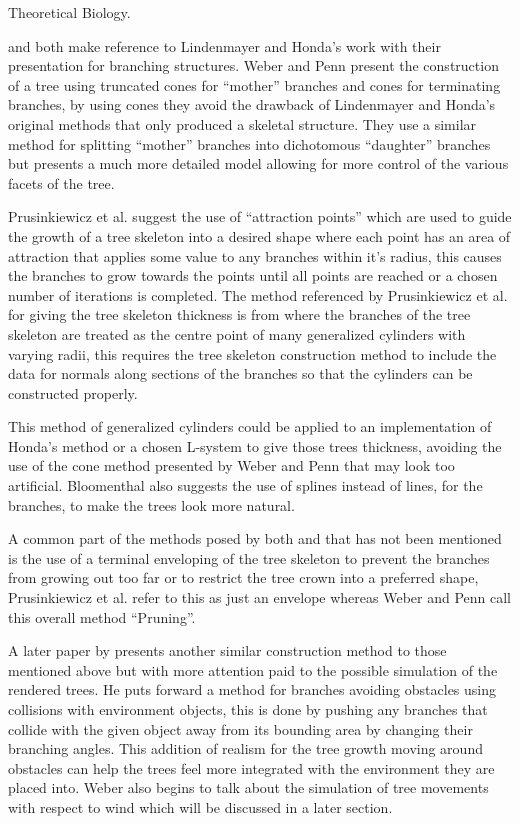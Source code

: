 \documentclass[review]{cmpreport}
\begin{document}
Theoretical Biology. \par
\cite{weber1995rendering} and \cite{runions2007colonization} both make reference to 
Lindenmayer and Honda's work with their presentation for branching structures. 
Weber and Penn present the construction of a tree using truncated cones for ``mother'' 
branches and cones for terminating branches, by using cones they avoid the drawback 
of Lindenmayer and Honda's original methods that only produced a skeletal structure. 
They use a similar method for splitting ``mother'' branches into dichotomous 
``daughter'' branches but presents a much more detailed model allowing for more 
control of the various facets of the tree. \par
Prusinkiewicz et al. suggest the use of ``attraction points'' which are used to 
guide the growth of a tree skeleton into a desired shape where each point has an 
area of attraction that applies some value to any branches within it's radius, this 
causes the branches to grow towards the points until all points are reached or a 
chosen number of iterations is completed. The method referenced by Prusinkiewicz 
et al. for giving the tree skeleton thickness is from \cite{bloomenthal1985modeling} 
where the branches of the tree skeleton are treated as the centre point of many 
generalized cylinders with varying radii, this requires the tree skeleton construction 
method to include the data for normals along sections of the branches so that the 
cylinders can be constructed properly. \par
This method of generalized cylinders could be applied to an implementation of Honda's 
method or a chosen L-system to give those trees thickness, avoiding the use of the 
cone method presented by Weber and Penn that may look too artificial. Bloomenthal 
also suggests the use of splines instead of lines, for the branches, to make the trees 
look more natural. \par
A common part of the methods posed by both \cite{weber1995rendering} and 
\cite{runions2007colonization} that has not been mentioned is the use of a terminal 
enveloping of the tree skeleton to prevent the branches from growing out too far or to 
restrict the tree crown into a preferred shape, Prusinkiewicz et al. refer to this as 
just an envelope whereas Weber and Penn call this overall method ``Pruning''. \par
A later paper by \cite{weber2008simulation} presents another similar construction method 
to those mentioned above but with more attention paid to the possible simulation of the 
rendered trees. He puts forward a method for branches avoiding obstacles using collisions 
with environment objects, this is done by pushing any branches that collide with the given 
object away from its bounding area by changing their branching angles. This addition 
of realism for the tree growth moving around obstacles can help the trees feel more 
integrated with the environment they are placed into. Weber also begins to talk about 
the simulation of tree movements with respect to wind which will be discussed in a 
later section.
\end{document}
